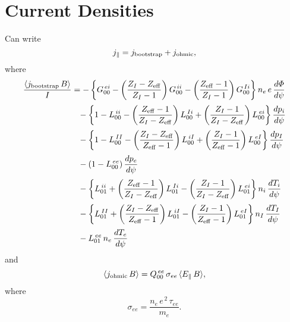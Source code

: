 \documentclass[notitlepage,12pt]{article}
\begin{document}
\section{Current Densities}
Can write
\begin{equation}
j_\parallel = j_{\rm bootstrap} + j_{\rm ohmic},
\end{equation}
where
\begin{align}
\frac{\langle j_{\rm bootstrap}\,B\rangle}{I}&=-\left\{G_{00}^{\,ei}-\left(\frac{Z_I-Z_{\rm eff}}{Z_I-1}\right)G^{\,ii}_{00}- \left(\frac{Z_{\rm eff}-1}{Z_I-1}\right)G_{00}^{\,Ii}\right\}n_e\,e\,\frac{d{\mit\Phi}}{d\psi}\nonumber\\[0.5ex]
&\phantom{=} -\left\{1-L^{\,ii}_{00} - \left(\frac{Z_{\rm eff}-1}{Z_I-Z_{\rm eff}}\right)L^{\,Ii}_{00}
+ \left(\frac{Z_I-1}{Z_I-Z_{\rm eff}}\right)L^{\,ei}_{00}\right\}\frac{dp_i}{d\psi}\nonumber\\[0.5ex]
&\phantom{=}
- \left\{1-L^{\,II}_{00} - \left(\frac{Z_I-Z_{\rm eff}}{Z_{\rm eff}-1}\right)L^{\,iI}_{00}
+ \left(\frac{Z_I-1}{Z_{\rm eff}-1}\right)L^{\,eI}_{00}\right\}\frac{dp_I}{d\psi}
\nonumber\\[0.5ex]
&\phantom{=}-(1-L^{\,ee}_{00})\,\frac{dp_e}{d\psi}\nonumber\\[0.5ex]
&\phantom{=}- \left\{L^{\,ii}_{01} + \left(\frac{Z_{\rm eff}-1}{Z_I-Z_{\rm eff}}\right)L^{\,Ii}_{01}
- \left(\frac{Z_I-1}{Z_I-Z_{\rm eff}}\right)L^{\,ei}_{01}\right\}n_i\,\frac{dT_i}{d\psi}\nonumber\\[0.5ex]
&\phantom{=}
- \left\{L^{\,II}_{01} + \left(\frac{Z_I-Z_{\rm eff}}{Z_{\rm eff}-1}\right)L^{\,iI}_{01}
- \left(\frac{Z_I-1}{Z_{\rm eff}-1}\right)L^{\,eI}_{01}\right\}n_I\,\frac{dT_I}{d\psi}
\nonumber\\[0.5ex]
&\phantom{=}-L^{\,ee}_{01}\,n_e\,\frac{dT_e}{d\psi}
\end{align}
and
\begin{equation}
\langle j_{\rm ohmic}\,B\rangle = Q^{\,ee}_{00}\,\sigma_{ee}\,\langle E_\parallel\,B\rangle,
\end{equation}
where 
\begin{equation}
\sigma_{ee} = \frac{n_e\,e^{\,2}\,\tau_{ee}}{m_e}.
\end{equation}
\end{document}
